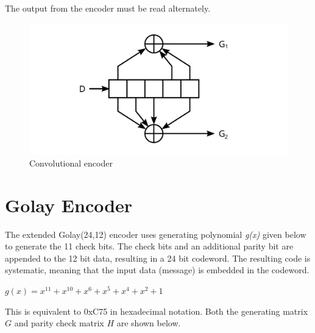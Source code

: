 \documentclass[a4paper,11pt,oneside]{book}
\begin{document}
The output from the encoder must be read alternately.

\begin{figure}[H]
	\centering
	\includegraphics{img/convolutional}
	\caption{Convolutional encoder}
	\label{fig:convolutional}
\end{figure}

\chapter{Golay Encoder}

The extended Golay(24,12) encoder uses generating polynomial \emph{g(x)} given below to generate the 11 check bits. The check bits and an additional parity bit are appended to the 12 bit data, resulting in a 24 bit codeword. The resulting code is systematic, meaning that the input data (message) is embedded in the codeword.

$g(x) = x^{11} + x^{10} + x^6 + x^5 + x^4 + x^2 + 1$

This is equivalent to 0xC75 in hexadecimal notation. Both the generating matrix $G$ and parity check matrix $H$ are shown below.
\end{document}
